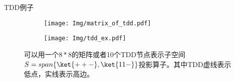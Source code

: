 \documentclass[aspectratio=1610]{ctexbeamer}
\begin{document}
\begin{frame}{TDD例子}
    \begin{figure}
        \begin{subfigure}{0.4\textwidth}
            \texttt{[image: Img/matrix\_of\_tdd.pdf]}
            \label{fig:mat_P}
        \end{subfigure}
        \qquad
        \qquad
        \qquad
        \begin{subfigure}[c]{0.4\textwidth}
            \centering
            \texttt{[image: Img/tdd\_ex.pdf]}
            \label{fig:tdd_P}
        \end{subfigure}
        \label{fig:P}
        \caption{可以用一个$8*8$的矩阵或者10个TDD节点表示子空间$S=span\{\ket{++-},\ket{11-}\}$投影算子。其中TDD虚线表示低点，实线表示高边。}
    \end{figure}
\end{frame}
        

        
\end{document}
